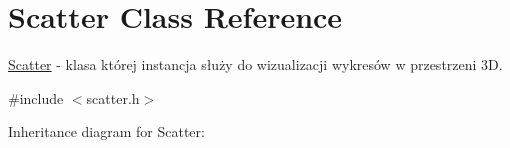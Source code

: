 \hypertarget{classScatter}{}\section{Scatter Class Reference}
\label{classScatter}


\hyperlink{classScatter}{Scatter} -\/ klasa której instancja służy do wizualizacji wykresów w przestrzeni 3D.  




{\ttfamily \#include $<$scatter.\+h$>$}



Inheritance diagram for Scatter\+:
